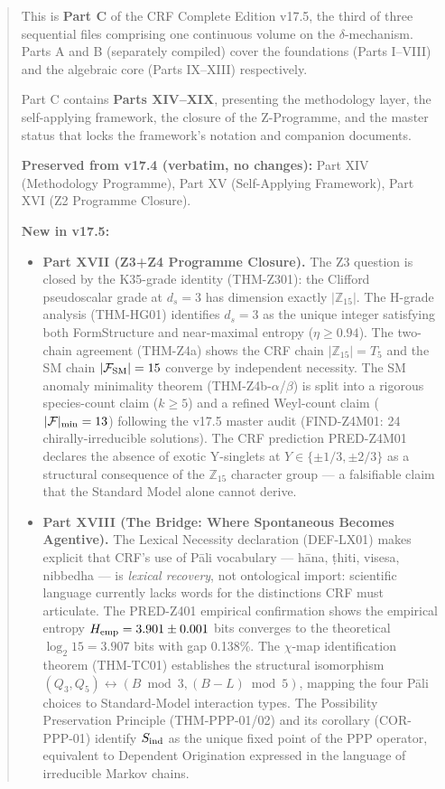 \documentclass[12pt, a4paper]{article}
\begin{document}
\maketitle

\begin{abstract}
\sloppy
This is \textbf{Part C} of the CRF Complete Edition v17.5, the third
of three sequential files comprising one continuous volume on the
$\delta$-mechanism. Parts A and B (separately compiled) cover the
foundations (Parts I--VIII) and the algebraic core (Parts IX--XIII)
respectively.

Part C contains \textbf{Parts XIV--XIX}, presenting the methodology layer,
the self-applying framework, the closure of the Z-Programme, and the
master status that locks the framework's notation and companion documents.

\textbf{Preserved from v17.4 (verbatim, no changes):}
Part XIV (Methodology Programme), Part XV (Self-Applying Framework),
Part XVI (Z2 Programme Closure).

\textbf{New in v17.5:}
\begin{itemize}[leftmargin=2em]
\item \textbf{Part XVII (Z3+Z4 Programme Closure).}
The Z3 question is closed by the K35-grade identity (THM-Z301):
the Clifford pseudoscalar grade at $d_s=3$ has dimension exactly
$|\mathbb{Z}_{15}|$. The H-grade analysis (THM-HG01) identifies
$d_s=3$ as the unique integer satisfying both FormStructure and
near-maximal entropy ($\eta \geq 0.94$). The two-chain agreement
(THM-Z4a) shows the CRF chain $|\mathbb{Z}_{15}| = T_5$ and the
SM chain $|\mathcal{F}_{\rm SM}| = 15$ converge by independent
necessity. The SM anomaly minimality theorem (THM-Z4b-$\alpha$/$\beta$)
is split into a rigorous species-count claim ($k \geq 5$) and a
refined Weyl-count claim ($|\mathcal{F}|_{\rm min} = 13$) following
the v17.5 master audit (FIND-Z4M01: 24 chirally-irreducible
solutions). The CRF prediction PRED-Z4M01 declares the absence of
exotic Y-singlets at $Y \in \{\pm 1/3, \pm 2/3\}$ as a structural
consequence of the $\mathbb{Z}_{15}$ character group --- a falsifiable
claim that the Standard Model alone cannot derive.

\item \textbf{Part XVIII (The Bridge: Where Spontaneous Becomes Agentive).}
The Lexical Necessity declaration (DEF-LX01) makes explicit that CRF's
use of P\=ali vocabulary --- h\=ana, \d{t}hiti, visesa, nibbedha --- is
\emph{lexical recovery}, not ontological import: scientific language
currently lacks words for the distinctions CRF must articulate.
The PRED-Z401 empirical confirmation shows the empirical entropy
$H_{\rm emp} = 3.901 \pm 0.001$ bits converges to the theoretical
$\log_2 15 = 3.907$ bits with gap 0.138\%. The $\chi$-map identification
theorem (THM-TC01) establishes the structural isomorphism
$(Q_3, Q_5) \leftrightarrow (B \bmod 3, (B-L) \bmod 5)$, mapping
the four P\=ali choices to Standard-Model interaction types.
The Possibility Preservation Principle (THM-PPP-01/02) and its
corollary (COR-PPP-01) identify $S_{\rm ind}$ as the unique fixed
point of the PPP operator, equivalent to Dependent Origination
expressed in the language of irreducible Markov chains.


\end{itemize}
\end{abstract}
\end{document}
